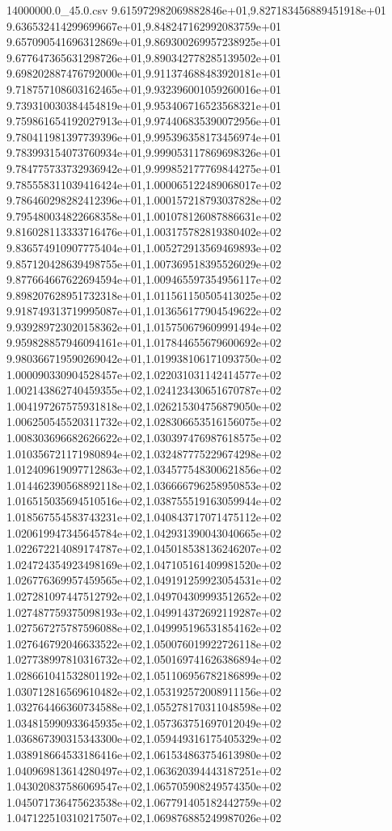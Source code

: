 \begin{filecontents*}{14000000.0_45.0.csv}
9.615972982069882846e+01,9.827183456889451918e+01
9.636532414299699667e+01,9.848247162992083759e+01
9.657090541696312869e+01,9.869300269957238925e+01
9.677647365631298726e+01,9.890342778285139502e+01
9.698202887476792000e+01,9.911374688483920181e+01
9.718757108603162465e+01,9.932396001059260016e+01
9.739310030384454819e+01,9.953406716523568321e+01
9.759861654192027913e+01,9.974406835390072956e+01
9.780411981397739396e+01,9.995396358173456974e+01
9.783993154073760934e+01,9.999053117869698326e+01
9.784775733732936942e+01,9.999852177769844275e+01
9.785558311039416424e+01,1.000065122489068017e+02
9.786460298282412396e+01,1.000157218793037828e+02
9.795480034822668358e+01,1.001078126087886631e+02
9.816028113333716476e+01,1.003175782819380402e+02
9.836574910907775404e+01,1.005272913569469893e+02
9.857120428639498755e+01,1.007369518395526029e+02
9.877664667622694594e+01,1.009465597354956117e+02
9.898207628951732318e+01,1.011561150505413025e+02
9.918749313719995087e+01,1.013656177904549622e+02
9.939289723020158362e+01,1.015750679609991494e+02
9.959828857946094161e+01,1.017844655679600692e+02
9.980366719590269042e+01,1.019938106171093750e+02
1.000090330904528457e+02,1.022031031142414577e+02
1.002143862740459355e+02,1.024123430651670787e+02
1.004197267575931818e+02,1.026215304756879050e+02
1.006250545520311732e+02,1.028306653516156075e+02
1.008303696682626622e+02,1.030397476987618575e+02
1.010356721171980894e+02,1.032487775229674298e+02
1.012409619097712863e+02,1.034577548300621856e+02
1.014462390568892118e+02,1.036666796258950853e+02
1.016515035694510516e+02,1.038755519163059944e+02
1.018567554583743231e+02,1.040843717071475112e+02
1.020619947345645784e+02,1.042931390043040665e+02
1.022672214089174787e+02,1.045018538136246207e+02
1.024724354923498169e+02,1.047105161409981520e+02
1.026776369957459565e+02,1.049191259923054531e+02
1.027281097447512792e+02,1.049704309993512652e+02
1.027487759375098193e+02,1.049914372692119287e+02
1.027567275787596088e+02,1.049995196531854162e+02
1.027646792046633522e+02,1.050076019922726118e+02
1.027738997810316732e+02,1.050169741626386894e+02
1.028661041532801192e+02,1.051106956782186899e+02
1.030712816569610482e+02,1.053192572008911156e+02
1.032764466360734588e+02,1.055278170311048598e+02
1.034815990933645935e+02,1.057363751697012049e+02
1.036867390315343300e+02,1.059449316175405329e+02
1.038918664533186416e+02,1.061534863754613980e+02
1.040969813614280497e+02,1.063620394443187251e+02
1.043020837586069547e+02,1.065705908249574350e+02
1.045071736475623538e+02,1.067791405182442759e+02
1.047122510310217507e+02,1.069876885249987026e+02

\end{filecontents*}

